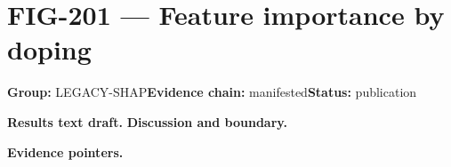 \clearpage
\section{FIG-201 --- Feature importance by doping}
\label{figpage:fig-201}
\textbf{Group:} LEGACY-SHAP\quad \textbf{Evidence chain:} manifested\quad \textbf{Status:} publication

\textbf{Results text draft.} 
\textbf{Discussion and boundary.} 


\textbf{Evidence pointers.}



\vfill

